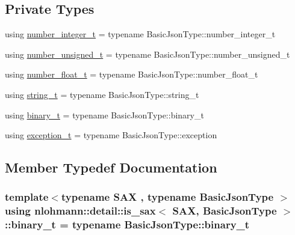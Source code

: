 \subsection*{Private Types}
\begin{DoxyCompactItemize}
\item 
using \hyperlink{structnlohmann_1_1detail_1_1is__sax_aa9a29390ca9810cee149510f586f5573}{number\+\_\+integer\+\_\+t} = typename Basic\+Json\+Type\+::number\+\_\+integer\+\_\+t
\item 
using \hyperlink{structnlohmann_1_1detail_1_1is__sax_a655c9b8038e51e5b9211e2419118644d}{number\+\_\+unsigned\+\_\+t} = typename Basic\+Json\+Type\+::number\+\_\+unsigned\+\_\+t
\item 
using \hyperlink{structnlohmann_1_1detail_1_1is__sax_a58d3205c8d3c7a01cc330374fa7976c5}{number\+\_\+float\+\_\+t} = typename Basic\+Json\+Type\+::number\+\_\+float\+\_\+t
\item 
using \hyperlink{structnlohmann_1_1detail_1_1is__sax_ad8e2e1427ff43536370b6db6ab83ae50}{string\+\_\+t} = typename Basic\+Json\+Type\+::string\+\_\+t
\item 
using \hyperlink{structnlohmann_1_1detail_1_1is__sax_ae6abc30644e683c20f8c2c4d63834fb8}{binary\+\_\+t} = typename Basic\+Json\+Type\+::binary\+\_\+t
\item 
using \hyperlink{structnlohmann_1_1detail_1_1is__sax_a6efa516f35d544cc8ce9a954f849fed1}{exception\+\_\+t} = typename Basic\+Json\+Type\+::exception
\end{DoxyCompactItemize}


\subsection{Member Typedef Documentation}
\subsubsection[{\texorpdfstring{binary\+\_\+t}{binary_t}}]{\setlength{\rightskip}{0pt plus 5cm}template$<$typename S\+AX , typename Basic\+Json\+Type $>$ using {\bf nlohmann\+::detail\+::is\+\_\+sax}$<$ S\+AX, Basic\+Json\+Type $>$\+::{\bf binary\+\_\+t} =  typename Basic\+Json\+Type\+::binary\+\_\+t\hspace{0.3cm}{\ttfamily [private]}}\hypertarget{structnlohmann_1_1detail_1_1is__sax_ae6abc30644e683c20f8c2c4d63834fb8}{}\label{structnlohmann_1_1detail_1_1is__sax_ae6abc30644e683c20f8c2c4d63834fb8}
